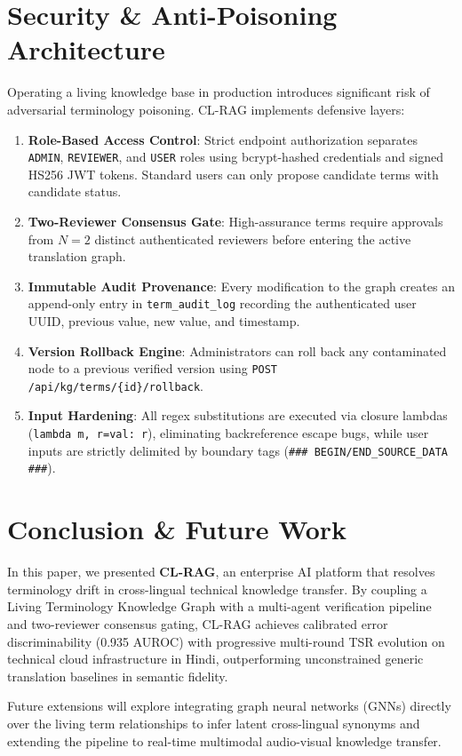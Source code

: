 \documentclass[conference]{IEEEtran}
\begin{document}
\section{Security \& Anti-Poisoning Architecture}
Operating a living knowledge base in production introduces significant risk of adversarial terminology poisoning. CL-RAG implements defensive layers:
\begin{enumerate}
    \item \textbf{Role-Based Access Control}: Strict endpoint authorization separates \texttt{ADMIN}, \texttt{REVIEWER}, and \texttt{USER} roles using bcrypt-hashed credentials and signed HS256 JWT tokens. Standard users can only propose candidate terms with candidate status.
    \item \textbf{Two-Reviewer Consensus Gate}: High-assurance terms require approvals from $N=2$ distinct authenticated reviewers before entering the active translation graph.
    \item \textbf{Immutable Audit Provenance}: Every modification to the graph creates an append-only entry in \texttt{term\_audit\_log} recording the authenticated user UUID, previous value, new value, and timestamp.
    \item \textbf{Version Rollback Engine}: Administrators can roll back any contaminated node to a previous verified version using \texttt{POST /api/kg/terms/\{id\}/rollback}.
    \item \textbf{Input Hardening}: All regex substitutions are executed via closure lambdas (\texttt{lambda m, r=val: r}), eliminating backreference escape bugs, while user inputs are strictly delimited by boundary tags (\texttt{\#\#\# BEGIN/END\_SOURCE\_DATA \#\#\#}).
\end{enumerate}

\section{Conclusion \& Future Work}
In this paper, we presented \textbf{CL-RAG}, an enterprise AI platform that resolves terminology drift in cross-lingual technical knowledge transfer. By coupling a Living Terminology Knowledge Graph with a multi-agent verification pipeline and two-reviewer consensus gating, CL-RAG achieves calibrated error discriminability (0.935 AUROC) with progressive multi-round TSR evolution on technical cloud infrastructure in Hindi, outperforming unconstrained generic translation baselines in semantic fidelity.

Future extensions will explore integrating graph neural networks (GNNs) directly over the living term relationships to infer latent cross-lingual synonyms and extending the pipeline to real-time multimodal audio-visual knowledge transfer.
\end{document}
